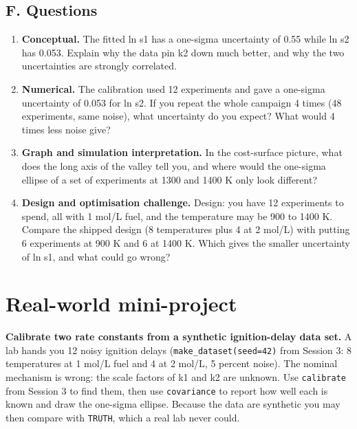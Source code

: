 \documentclass[11pt,a4paper]{article}
\begin{document}
\subsection*{F. Questions}
\begin{enumerate}[nosep]
\item \textbf{Conceptual.} The fitted ln s1 has a one-sigma uncertainty of 0.55 while ln s2 has 0.053. Explain why the data pin k2 down much better, and why the two uncertainties are strongly correlated.
\item \textbf{Numerical.} The calibration used 12 experiments and gave a one-sigma uncertainty of 0.053 for ln s2. If you repeat the whole campaign 4 times (48 experiments, same noise), what uncertainty do you expect? What would 4 times less noise give?
\item \textbf{Graph and simulation interpretation.} In the cost-surface picture, what does the long axis of the valley tell you, and where would the one-sigma ellipse of a set of experiments at 1300 and 1400 K only look different?
\item \textbf{Design and optimisation challenge.} Design: you have 12 experiments to spend, all with 1 mol/L fuel, and the temperature may be 900 to 1400 K. Compare the shipped design (8 temperatures plus 4 at 2 mol/L) with putting 6 experiments at 900 K and 6 at 1400 K. Which gives the smaller uncertainty of ln s1, and what could go wrong?
\end{enumerate}

\section{Real-world mini-project}
\textbf{Calibrate two rate constants from a synthetic ignition-delay data set.} A lab hands you 12 noisy ignition delays (\texttt{make\_dataset(seed=42)} from Session 3: 8 temperatures at 1 mol/L fuel and 4 at 2 mol/L, 5 percent noise). The nominal mechanism is wrong: the scale factors of k1 and k2 are unknown. Use \texttt{calibrate} from Session 3 to find them, then use \texttt{covariance} to report how well each is known and draw the one-sigma ellipse. Because the data are synthetic you may then compare with \texttt{TRUTH}, which a real lab never could.
\end{document}
